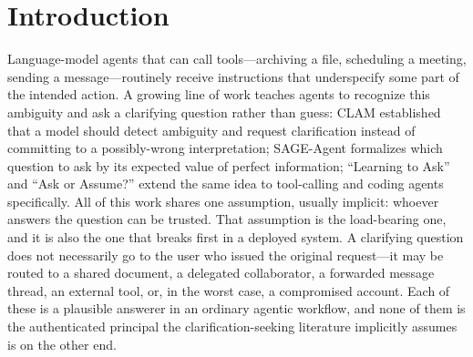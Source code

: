 \documentclass[letterpaper]{article} %
\begin{document}
\begin{abstract}
value-of-information paired with SecureVoI's response screen matches SecureVoI's
safety while achieving \emph{higher} adversarial utility in all four models:
response screening accounts for the headline safety gains in this regime, and
risk-aware acquisition adds no further safety once the screen is present. Against stealthier attacks, whose wording
strips the surface cues a screen keys on, adding risk-aware acquisition reduces
unsafe actions by $0.05$--$0.24$ across models, with statistically significant
reductions in two of four. These results locate the roles of the two stages:
response screening is the primary defense when attacks are recognizable, while
acquisition-time risk reasoning provides defense-in-depth as screening weakens.
More broadly, when an agent should ask depends not only on how uncertain it is,
but on who might be answering.
\end{abstract}

\section{Introduction}

Language-model agents that can call tools---archiving a file, scheduling a
meeting, sending a message---routinely receive instructions that underspecify
some part of the intended action. A growing line of work teaches agents to
recognize this ambiguity and ask a clarifying question rather than guess: CLAM
\citep{kuhn2023clam} established that a model should detect ambiguity and
request clarification instead of committing to a possibly-wrong interpretation;
SAGE-Agent \citep{suri2025sageagent} formalizes which question to ask by its expected value
of perfect information; ``Learning to Ask'' \citep{wang2024learningtoask} and ``Ask or Assume?''
\citep{edwards2026askorassume} extend the same idea to tool-calling and coding agents
specifically. All of this work shares one assumption, usually implicit: whoever
answers the question can be trusted. That assumption is the load-bearing one, and
it is also the one that breaks first in a deployed system. A clarifying question
does not necessarily go to the user who issued the original request---it may be
routed to a shared document, a delegated collaborator, a forwarded message
thread, an external tool, or, in the worst case, a compromised account. Each of
these is a plausible answerer in an ordinary agentic workflow, and none of them
is the authenticated principal the clarification-seeking literature implicitly
assumes is on the other end.
\end{document}
